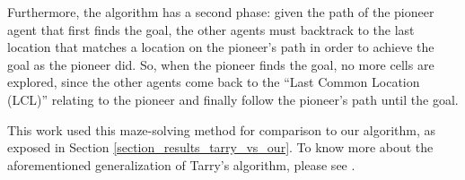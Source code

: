 Furthermore, the algorithm has a second phase: given the path of the pioneer agent that first finds the goal, the other agents must backtrack to the last location that matches a location on the pioneer's path in order to achieve the goal as the pioneer did. So, when the pioneer finds the goal, no more cells are explored, since the other agents come back to the ``Last Common Location (LCL)'' relating to the pioneer and finally follow the pioneer's path until the goal.

This work used this maze-solving method for comparison to our algorithm, as exposed in Section \ref{section_results_tarry_vs_our}. To know more about the aforementioned generalization of Tarry's algorithm, please see .









